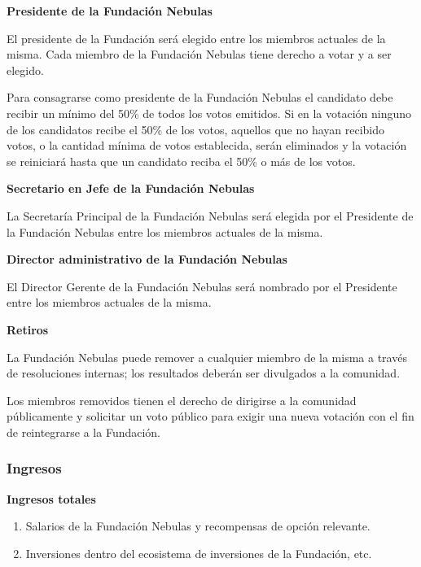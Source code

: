 \vspace{2em}

\textbf{Presidente de la Fundación Nebulas}

El presidente de la Fundación será elegido entre los miembros actuales de la misma. Cada miembro de la Fundación Nebulas tiene derecho a votar y a ser elegido.

Para consagrarse como presidente de la Fundación Nebulas el candidato debe recibir un mínimo del 50\% de todos los votos emitidos. Si en la votación ninguno de los candidatos recibe el 50\% de los votos, aquellos que no hayan recibido votos, o la cantidad mínima de votos establecida, serán eliminados y la votación se reiniciará hasta que un candidato reciba el 50\% o más de los votos.

\vspace{2em}

\textbf{Secretario en Jefe de la Fundación Nebulas}

La Secretaría Principal de la Fundación Nebulas será elegida por el Presidente de la Fundación Nebulas entre los miembros actuales de la misma.

\vspace{2em}

\textbf{Director administrativo de la Fundación Nebulas}

El Director Gerente de la Fundación Nebulas será nombrado por el Presidente entre los miembros actuales de la misma.

\vspace{2em}

\textbf{Retiros}

La Fundación Nebulas puede remover a cualquier miembro de la misma a través de resoluciones internas; los resultados deberán ser divulgados a la comunidad.

Los miembros removidos tienen el derecho de dirigirse a la comunidad públicamente y solicitar un voto público \onchain para exigir una nueva votación con el fin de reintegrarse a la Fundación.

\subsubsection{Ingresos}

\textbf{Ingresos totales}

\begin{enumerate}
	\item Salarios de la Fundación Nebulas y recompensas de opción relevante.
	\item Inversiones dentro del ecosistema de inversiones de la Fundación, etc.
\end{enumerate}

